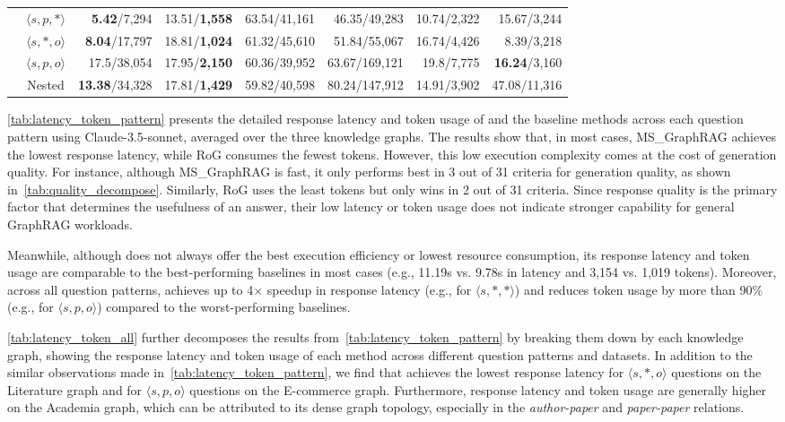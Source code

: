\begin{table}[ht]
{\begin{tabular}{@{}ccrrrrrr@{}}
 & $\langle s,p,* \rangle$ & \textbf{5.42}/7,294 & 13.51/\textbf{1,558} & 63.54/41,161 & 46.35/49,283 & 10.74/2,322 & 15.67/3,244 \\
 & $\langle s,*,o \rangle$ & \textbf{8.04}/17,797 & 18.81/\textbf{1,024} & 61.32/45,610 & 51.84/55,067 & 16.74/4,426 & 8.39/3,218 \\
 & $\langle s,p,o \rangle$ & 17.5/38,054 & 17.95/\textbf{2,150} & 60.36/39,952 & 63.67/169,121 & 19.8/7,775 & \textbf{16.24}/3,160 \\
 & Nested & \textbf{13.38}/34,328 & 17.81/\textbf{1,429} & 59.82/40,598 & 80.24/147,912 & 14.91/3,902 & 47.08/11,316 \\ \bottomrule
\end{tabular}%
}
\end{table}

 \autoref{tab:latency_token_pattern} presents the detailed response latency and token usage of \name{} and the baseline methods across each question pattern using Claude-3.5-sonnet, averaged over the three knowledge graphs. The results show that, in most cases, MS\_GraphRAG achieves the lowest response latency, while RoG consumes the fewest tokens. However, this low execution complexity comes at the cost of generation quality. For instance, although MS\_GraphRAG is fast, it only performs best in 3 out of 31 criteria for generation quality, as shown in~\autoref{tab:quality_decompose}. Similarly, RoG uses the least tokens but only wins in 2 out of 31 criteria. Since response quality is the primary factor that determines the usefulness of an answer, their low latency or token usage does not indicate stronger capability for general GraphRAG workloads.

Meanwhile, although \name{} does not always offer the best execution efficiency or lowest resource consumption, its response latency and token usage are comparable to the best-performing baselines in most cases (e.g., 11.19s vs. 9.78s in latency and 3,154 vs. 1,019 tokens). Moreover, across all question patterns, \name{} achieves up to 4× speedup in response latency (e.g., for $\langle s,*,* \rangle$) and reduces token usage by more than 90\% (e.g., for $\langle s,p,o \rangle$) compared to the worst-performing baselines.


 \autoref{tab:latency_token_all} further decomposes the results from~\autoref{tab:latency_token_pattern} by breaking them down by each knowledge graph, showing the response latency and token usage of each method across different question patterns and datasets. In addition to the similar observations made in~\autoref{tab:latency_token_pattern}, we find that \name{} achieves the lowest response latency for $\langle s,*,o \rangle$ questions on the Literature graph and for $\langle s,p,o \rangle$ questions on the E-commerce graph. Furthermore, response latency and token usage are generally higher on the Academia graph, which can be attributed to its dense graph topology, especially in the \textit{author-paper} and \textit{paper-paper} relations.


